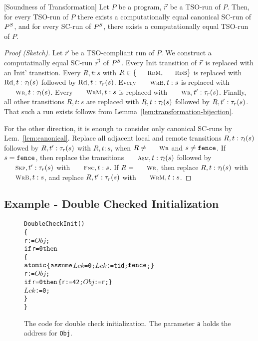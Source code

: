 \begin{theorem}\label{thm:soundness}[Soundness of Transformation]
Let $P$ be a program, $\vec{r}$ be a TSO-run of $P$.
Then, for every TSO-run of $P$ there exists a computationally equal canonical SC-run of $P^S$,
and for every SC-run of $P^S$, there exists a computationally equal TSO-run of $P$. 
\end{theorem}
\begin{proof}[Proof (Sketch)]
Let $\vec{r}$ be a TSO-compliant run of $P$.
We construct a computatinally equal SC-run $\vec{r'}$ of $P^S$.
Every {\sc\small Init} transition of $\vec{r}$ is replaced with an {\sc\small Init'} transition.
Every $R,t:s$ with $R\in \{\textnormal{\sc\small RdM},\textnormal{\sc\small RdB}\}$ is replaced with $\textnormal{Rd},t:\tau_{l}(s)$ followed by $\textnormal{Rd},t:\tau_{r}(s)$.
Every $\textnormal{\sc\small WrB},t:s$ is replaced with $\textnormal{\sc\small Wr},t:\aliloctransx s$.
Every $\textnormal{\sc\small WrM},t:s$ is replaced with $\textnormal{\sc\small Wr},t':\aliremtransx s$.
Finally, all other transitions $R,t:s$ are replaced with $R,t:\tau_{l}(s)$ followed by $R,t':\tau_{r}(s)$.
That such a run exists follows from Lemma~\ref{lem:transformation-bijection}.

For the other direction, it is enough to consider only canonical SC-runs by Lem.~\ref{lem:canonical}.
Replace all adjacent local and remote transitions $R,t:\tau_{l}(s)$ followed by $R,t':\tau_{r}(s)$ with $R,t:s$, when $R\neq \textnormal{\sc\small Wr}$ and $s\neq\mathtt{fence}$.
If $s=\mathtt{fence}$, then replace the transitions $\textnormal{\sc\small Asm},t:\aliloctransx s$ followed by $\textnormal{\sc\small Skp},t':\aliremtransx s$ with $\textnormal{\sc\small Fnc},t:s$.
If $R=\textnormal{\sc\small Wr}$, then replace $R,t:\tau_{l}(s)$ with $\textnormal{\sc\small WrB},t:s$, and replace $R,t':\tau_{r}(s)$ with $\textnormal{\sc\small WrM},t:s$.
\end{proof}






\subsection{Example - Double Checked Initialization}
\label{subsec:example-double-check}

\begin{figure}[ht]
\begin{alltt}DoubleCheckInit() 
\{
 r:=\(Obj\);
 \(\aliif\) r=0 \(\alithen\) 
 \{
  \(\aliatomic\) \{ \(\aliassume\) {\(Lck\)=0}; \(Lck\):=tid; \(\alifence\); \}
  r:=\(Obj\);
  \(\aliif\) r=0 \(\alithen\) \{ r:=42; \(Obj\):=r; \}
  \(Lck\):=0;
 \}
\}\end{alltt}
\caption{The code for double check initialization. The parameter {\tt a} holds the address for {\tt Obj}.}
\label{fig:double-check}
\end{figure}

